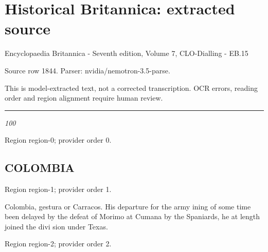 \documentclass[11pt]{article}
\begin{document}
\section*{Historical Britannica: extracted source}
Encyclopaedia Britannica - Seventh edition, Volume 7, CLO-Dialling - EB.15\par
{\small Source row 1844. Parser: nvidia/nemotron-3.5-parse.\par}
{\small This is model-extracted text, not a corrected transcription. OCR errors, reading order and region alignment require human review.\par}
\hrule\medskip
{\small\itshape 100\par}

{\scriptsize\color{gray} Region region-0; provider order 0.\par}
\medskip

\subsection*{COLOMBIA}

{\scriptsize\color{gray} Region region-1; provider order 1.\par}
\medskip

Colombia, gestura or Carracos. His departure for the army ining of some time been delayed by the defeat of Morimo at Cumana by the Spaniards, he at length joined the divi sion under Texas.
\par

{\scriptsize\color{gray} Region region-2; provider order 2.\par}
\medskip
\end{document}
